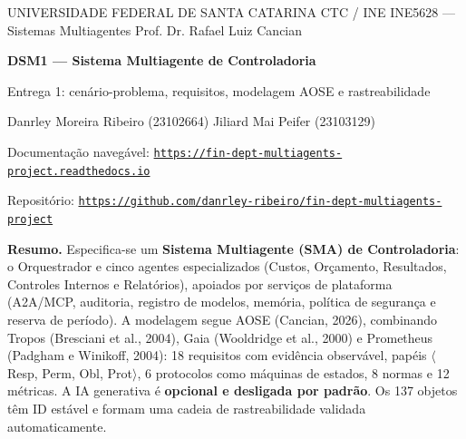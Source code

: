 \documentclass[10pt,a4paper]{article}
\newcommand{\autorA}{Danrley Moreira Ribeiro}
\newcommand{\matA}{23102664}
\newcommand{\autorB}{Jiliard Mai Peifer}
\newcommand{\matB}{23103129}
\newcommand{\repoURL}{https://github.com/danrley-ribeiro/fin-dept-multiagents-project}
\newcommand{\docsURL}{https://fin-dept-multiagents-project.readthedocs.io}
\newcommand{\nReq}{18}
\newcommand{\nObj}{137}
\newcommand{\nMet}{12}
\newcommand{\nProt}{6}
\newcommand{\nNorm}{8}
\begin{document}
\thispagestyle{primeira}
\begin{center}
{\footnotesize UNIVERSIDADE FEDERAL DE SANTA CATARINA \textbullet{} CTC / INE \textbullet{} INE5628 — Sistemas Multiagentes \textbullet{} Prof. Dr. Rafael Luiz Cancian\par}
\vspace{0.25em}
{\Large\bfseries DSM1 — Sistema Multiagente de Controladoria\par}
\vspace{0.1em}
{\normalsize Entrega 1: cenário-problema, requisitos, modelagem AOSE e rastreabilidade\par}
\vspace{0.2em}
{\small \autorA{} (\matA) \textbullet{} \autorB{} (\matB)\par}
{\footnotesize Documentação navegável: \href{\docsURL}{\texttt{\docsURL}}\par}
{\footnotesize Repositório: \href{\repoURL}{\texttt{\repoURL}}\par}
\end{center}
\vspace{0.4em}

\textbf{Resumo.} Especifica-se um \textbf{Sistema Multiagente (SMA) de Controladoria}: o Orquestrador e cinco
agentes especializados (Custos, Orçamento, Resultados, Controles Internos e Relatórios), apoiados por serviços de
plataforma (A2A/MCP, auditoria, registro de modelos, memória, política de segurança e reserva de período). A
modelagem segue AOSE (Cancian, 2026), combinando Tropos (Bresciani et al., 2004), Gaia
(Wooldridge et al., 2000) e Prometheus (Padgham e Winikoff, 2004): \nReq{} requisitos com evidência
observável, papéis $\langle$Resp, Perm, Obl, Prot$\rangle$, \nProt{} protocolos como máquinas de estados,
\nNorm{} normas e \nMet{} métricas. A IA generativa é \textbf{opcional e desligada por padrão}. Os \nObj{} objetos
têm ID estável e formam uma cadeia de rastreabilidade validada automaticamente.
\end{document}
